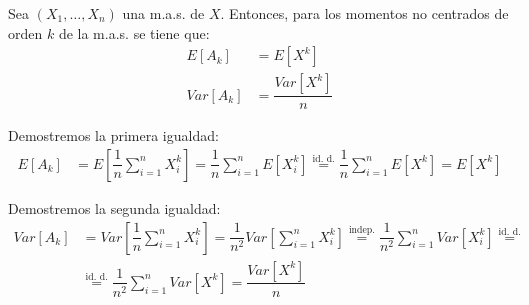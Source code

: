 \begin{ejemplo}
    Sea $(X_1, \ldots, X_n)$ una m.a.s. de $X$. Entonces, para los momentos no centrados de orden $k$ de la m.a.s. se tiene que:
    \begin{align*}
        E\left[A_k\right] &= E[X^k] \\
        Var\left[A_k\right] &= \dfrac{Var[X^k]}{n}
    \end{align*}

    Demostremos la primera igualdad:
    \begin{align*}
        E\left[A_k\right] &= E\left[\dfrac{1}{n}\sum\limits_{i=1}^{n}X_i^k\right] = \dfrac{1}{n}\sum\limits_{i=1}^{n}E[X_i^k]
        \stackrel{\text{id. d.}}{=} \dfrac{1}{n}\sum\limits_{i=1}^{n}E[X^k] = E[X^k]
    \end{align*}

    Demostremos la segunda igualdad:
    \begin{align*}
        Var\left[A_k\right] &= Var\left[\dfrac{1}{n}\sum\limits_{i=1}^{n}X_i^k\right] = \dfrac{1}{n^2}Var\left[\sum\limits_{i=1}^{n}X_i^k\right]
        \stackrel{\text{indep.}}{=} \dfrac{1}{n^2}\sum\limits_{i=1}^{n}Var[X_i^k]
        \stackrel{\text{id. d.}}{=}\\&\stackrel{\text{id. d.}}{=}
        \dfrac{1}{n^2}\sum\limits_{i=1}^{n}Var[X^k] = \dfrac{Var[X^k]}{n}
    \end{align*}
\end{ejemplo}
